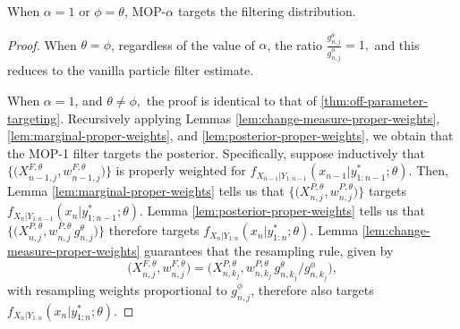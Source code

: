 \begin{prop}
    When $\alpha=1$ or $\phi=\theta$, MOP-$\alpha$ targets the filtering distribution. 
\end{prop}
\begin{proof}
    When $\theta=\phi$, regardless of the value of $\alpha$, the ratio $\frac{g_{n,j}^\theta}{g_{n,j}^\phi}=1,$ and this reduces to the vanilla particle filter estimate.

    When $\alpha=1$, and $\theta\neq\phi,$ the proof is identical to that of \ref{thm:off-parameter-targeting}. Recursively applying Lemmas \ref{lem:change-measure-proper-weights}, \ref{lem:marginal-proper-weights}, and \ref{lem:posterior-proper-weights}, we obtain that 
    the MOP-1 filter targets the posterior.
    Specifically, suppose inductively that $\big\{\big(X^{F,\theta}_{n-1,j},w^{F,\theta}_{n-1,j}\big)\big\}$ is properly weighted for $f_{X_{n-1}|Y_{1:n-1}}(x_{n-1}|y^*_{1:n-1};\theta)$.
    Then, Lemma \ref{lem:marginal-proper-weights} tells us that $\big\{\big(X^{P,\theta}_{n,j},w^{P,\theta}_{n,j}\big)\big\}$ targets $f_{X_{n}|Y_{1:n-1}}(x_{n}|y^*_{1:n-1};\theta)$.
    Lemma \ref{lem:posterior-proper-weights} tells us that $\big\{\big(X^{P,\theta}_{n,j},w^{P,\theta}_{n,j} \, g^\theta_{n,j} \big)\big\}$ therefore targets  $f_{X_{n}|Y_{1:n}}(x_{n}|y^*_{1:n};\theta)$.
    Lemma \ref{lem:change-measure-proper-weights} guarantees that the resampling rule, given by 
    \begin{equation}
    \big(X^{F,\theta}_{n,j},w^{F,\theta}_{n,j}\big) = \big(X^{P,\theta}_{n,k_j}, w^{P,\theta}_{n,k_j} \, g^\theta_{n,k_j}\big/ g^\phi_{n,k_j}\big),
    \end{equation}
    with resampling weights proportional to $g^\phi_{n,j}$, therefore also targets $f_{X_{n}|Y_{1:n}}(x_{n}|y^*_{1:n};\theta)$.
\end{proof}


